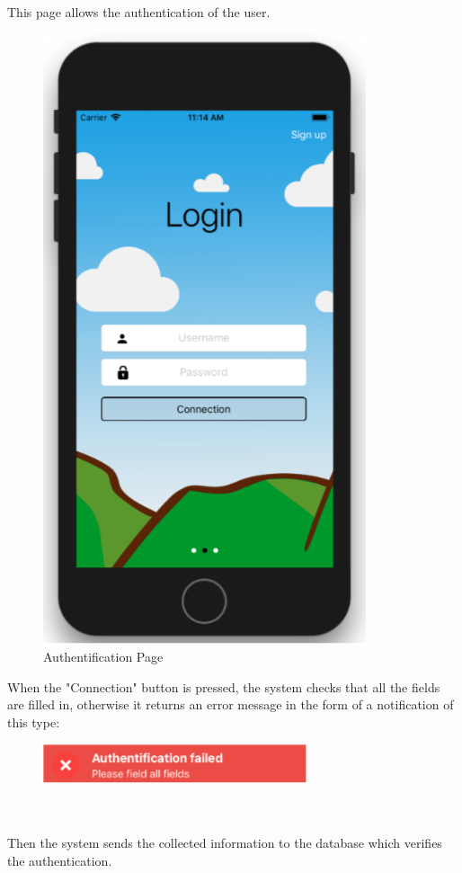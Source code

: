 This page allows the authentication of the user.
\begin{figure}[h!]
\begin{center}
\includegraphics[scale = 0.3]{diagrams/AuthentificationPage.png} 
\end{center}
\caption{Authentification Page}
\end{figure}
When the "Connection" button is pressed, the system checks that all the fields are filled in, otherwise it returns an error message in the form of a notification of this type:
\begin{figure}[h!]
\begin{center}
\includegraphics[scale = 0.3]{diagrams/AuthentificationPageFailed.png} 
\end{center}
\end{figure}
\\\\
Then the system sends the collected information to the database which verifies the authentication.

